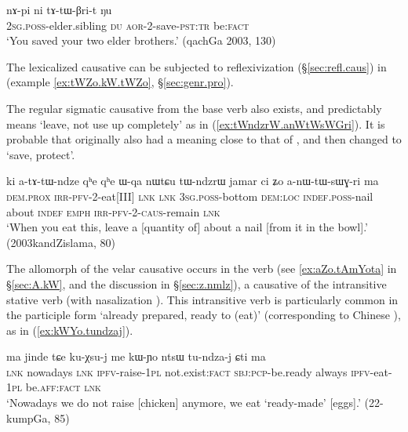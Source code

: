 \begin{exe}
\ex \label{ex:tatWBrit}
 \gll nɤ-pi ni tɤ-tɯ-βri-t ŋu \\
\textsc{2sg}.\textsc{poss}-elder.sibling \textsc{du} \textsc{aor}-2-save-\textsc{pst}:\textsc{tr} be:\textsc{fact} \\
\glt `You saved your two elder brothers.' (qachGa 2003, 130)
\end{exe}

The lexicalized causative  can be subjected to reflexivization (§\ref{sec:refl.caus}) in  (example \ref{ex:tWZo.kW.tWZo}, §\ref{sec:genr.pro}). 

The regular sigmatic causative  from the base verb  also exists, and  predictably means  `leave, not use up completely' as in (\ref{ex:tWndzrW.anWtWsWGri}). It is probable that  originally also had a meaning close to that of , and then changed to `save, protect'.   
 
\begin{exe}
\ex \label{ex:tWndzrW.anWtWsWGri}
 \gll ki a-tɤ-tɯ-ndze qʰe qʰe ɯ-qa nɯtɕu tɯ-ndzrɯ jamar ci ʑo a-nɯ-tɯ-sɯɣ-ri ma \\
 \textsc{dem}.\textsc{prox} \textsc{irr}-\textsc{pfv}-2-eat[III] \textsc{lnk} \textsc{lnk} \textsc{3sg}.\textsc{poss}-bottom \textsc{dem}:\textsc{loc} \textsc{indef}.\textsc{poss}-nail about \textsc{indef} \textsc{emph}  \textsc{irr}-\textsc{pfv}-2-\textsc{caus}-remain \textsc{lnk} \\
\glt `When you eat this, leave a [quantity of] about a nail [from it in the bowl].' (2003kandZislama, 80)
\end{exe}
 
The  allomorph of the velar causative occurs in the verb  (see \ref{ex:aZo.tAmYota} in §\ref{sec:A.kW}, and the discussion in §\ref{sec:z.nmlz}), a causative of the intransitive stative verb  (with nasalization  \fl{} ). This  intransitive verb is particularly common in the participle form  `already prepared, ready to (eat)' (corresponding to Chinese ), as in (\ref{ex:kWYo.tundzaj}).  

\begin{exe}
\ex \label{ex:kWYo.tundzaj}
 \gll ma jinde tɕe ku-χsu-j me kɯ-ɲo ntsɯ tu-ndza-j ɕti ma \\
 \textsc{lnk} nowadays \textsc{lnk} \textsc{ipfv}-raise-\textsc{1pl} not.exist:\textsc{fact} \textsc{sbj}:\textsc{pcp}-be.ready always \textsc{ipfv}-eat-\textsc{1pl} be.\textsc{aff}:\textsc{fact} \textsc{lnk} \\
 \glt `Nowadays we do not raise [chicken] anymore, we eat `ready-made' [eggs].'  (22-kumpGa, 85)
 \end{exe}
 
